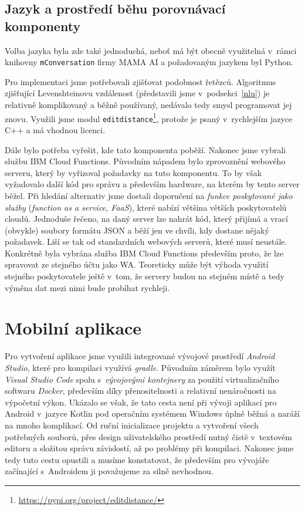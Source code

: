 \subsection{Jazyk a prostředí běhu porovnávací komponenty}

Volba jazyka byla zde také jednoduchá, neboť má být obecně využitelná v~rámci
knihovny \texttt{mConversation} firmy MAMA AI a požadovaným jazykem byl Python.

Pro implementaci jsme potřebovali zjišťovat podobnost řetězců. Algoritmus
zjišťující Levenshteinovu vzdálenost (představili jsme v~podsekci~\ref{nlu})
je relativně komplikovaný a běžně používaný, nedávalo tedy
smysl programovat jej znovu. Využili jsme modul
\texttt{editdistance}\footnote{\url{https://pypi.org/project/editdistance/}},
protože je psaný v~rychlejším jazyce C++ a má vhodnou licenci.

Dále bylo potřeba vyřešit, kde tato komponenta poběží. Nakonec jsme vybrali
službu IBM Cloud Functions. Původním nápadem bylo
zprovoznění webového serveru, který by vyřizoval požadavky na tuto komponentu.
To by však vyžadovalo další kód pro správu a především hardware, na kterém by
tento server běžel. Při hledání alternativ jsme dostali doporučení na
\textit{funkce poskytované jako služby} (\textit{function as a service, FaaS}),
které nabízí většina větších poskytovatelů cloudů. Jednoduše řečeno, na daný
server lze nahrát kód, který přijímá a vrací (obvykle) soubory formátu JSON a
běží jen ve chvíli, kdy dostane nějaký požadavek. Liší se tak od standardních
webových serverů, které musí  neustále. Konkrétně byla vybrána
služba IBM Cloud Functions především proto, že lze spravovat ze stejného účtu jako
WA. Teoreticky může být výhoda využití stejného poskytovatele ještě v~tom, že
servery budou na stejném místě a tedy výměna dat mezi nimi bude probíhat rychleji.

\section{Mobilní aplikace}\label{app}

Pro vytvoření aplikace jsme využili integrované vývojové prostředí
\textit{Android Studio}, které pro kompilaci využívá \textit{gradle}.
Původním záměrem bylo využít \textit{Visual Studio Code}
spolu s~\textit{vývojovými kontejnery} za použití virtualizačního softwaru
\textit{Docker}, především díky přenositelnosti a relativní nenáročnosti
na výpočetní výkon. Ukázalo se však, že tato cesta není při vývoji aplikací
pro Android v~jazyce Kotlin pod operačním systémem Windows úplně běžná a
naráží na mnoho komplikací. Od ruční inicializace projektu a vytvoření všech
potřebných souborů, přes design uživatelského
prostředí nutný čistě v~textovém editoru a složitou správu závislostí,
až po problémy při kompilaci. Nakonec jsme tedy tuto cestu opustili a
musíme konstatovat, že především pro vývojáře začínající s~Androidem
ji považujeme za silně nevhodnou.


